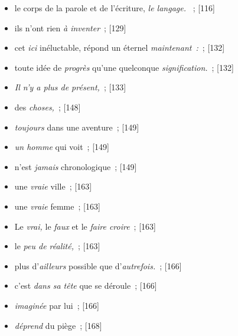 \documentclass[12pt, a4paper]{article}
\begin{document}
\begin{itemize}
    \item le corps de la parole et de l’écriture, \textit{le langage. }{\color{gray}~; [116]}

    \item ils n’ont rien \textit{à inventer}{\color{gray}~; [129]}

    \item cet \textit{ici} inéluctable, répond un éternel \textit{maintenant~:}{\color{gray}~; [132]}

    \item toute idée de \textit{progrès} qu’une quelconque \textit{signification.}{\color{gray}~; [132]}

    \item \textit{Il n’y a plus de présent,}{\color{gray}~; [133]}

    \item des \textit{choses,}{\color{gray}~; [148]}

    \item \textit{toujours} dans une aventure{\color{gray}~; [149]}

    \item \textit{un homme} qui voit{\color{gray}~; [149]}

    \item n’est \textit{jamais} chronologique{\color{gray}~; [149]}

    \item une \textit{vraie} ville{\color{gray}~; [163]}

    \item une \textit{vraie} femme{\color{gray}~; [163]}

    \item  Le \textit{vrai,} le \textit{faux} et le \textit{faire croire}{\color{gray}~; [163]}

    \item le \textit{peu de réalité,}{\color{gray}~; [163]}

    \item plus d’\textit{ailleurs} possible que d’\textit{autrefois.}{\color{gray}~; [166]}

    \item c’est \textit{dans sa tête} que se déroule{\color{gray}~; [166]}

    \item \textit{imaginée }par lui{\color{gray}~; [166]}

    \item \textit{déprend} du piège{\color{gray}~; [168]}


\end{itemize}
\end{document}
